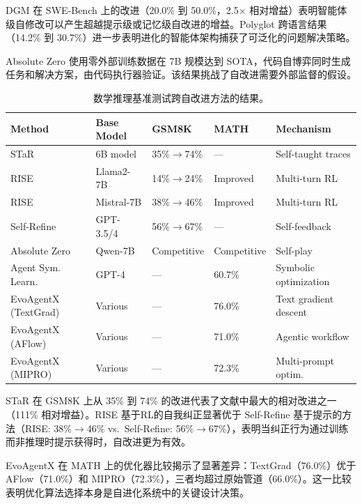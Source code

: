 DGM 在 SWE-Bench 上的改进（20.0\% 到 50.0\%，2.5$\times$ 相对增益）表明智能体级自修改可以产生超越提示级或记忆级自改进的增益。Polyglot 跨语言结果（14.2\% 到 30.7\%）进一步表明进化的智能体架构捕获了可泛化的问题解决策略。

Absolute Zero 使用零外部训练数据在 7B 规模达到 SOTA，代码自博弈同时生成任务和解决方案，由代码执行器验证。该结果挑战了自改进需要外部监督的假设。

\begin{table}[htbp]
\centering
\small
\caption{数学推理基准测试跨自改进方法的结果。}
\label{tab:eval-math}
\begin{tabular}{p{28mm}p{22mm}p{18mm}p{18mm}p{30mm}}
\toprule
\textbf{Method} & \textbf{Base Model} & \textbf{GSM8K} & \textbf{MATH} & \textbf{Mechanism} \\
\midrule
STaR & 6B model & 35\%$\to$74\% & --- & Self-taught traces \\
RISE & Llama2-7B & 14\%$\to$24\% & Improved & Multi-turn RL \\
RISE & Mistral-7B & 38\%$\to$46\% & Improved & Multi-turn RL \\
Self-Refine & GPT-3.5/4 & 56\%$\to$67\% & --- & Self-feedback \\
Absolute Zero & Qwen-7B & Competitive & Competitive & Self-play \\
Agent Sym. Learn. & GPT-4 & --- & 60.7\% & Symbolic optimization \\
EvoAgentX (TextGrad) & Various & --- & 76.0\% & Text gradient descent \\
EvoAgentX (AFlow) & Various & --- & 71.0\% & Agentic workflow \\
EvoAgentX (MIPRO) & Various & --- & 72.3\% & Multi-prompt optim. \\
\bottomrule
\end{tabular}
\end{table}

STaR 在 GSM8K 上从 35\% 到 74\% 的改进代表了文献中最大的相对改进之一（111\% 相对增益）。RISE 基于RL的自我纠正显著优于 Self-Refine 基于提示的方法（RISE: 38\%$\to$46\% vs.\ Self-Refine: 56\%$\to$67\%），表明当纠正行为通过训练而非推理时提示获得时，自改进更为有效。

EvoAgentX 在 MATH 上的优化器比较揭示了显著差异：TextGrad（76.0\%）优于 AFlow（71.0\%）和 MIPRO（72.3\%），三者均超过原始管道（66.0\%）。这一比较表明优化算法选择本身是自进化系统中的关键设计决策。

